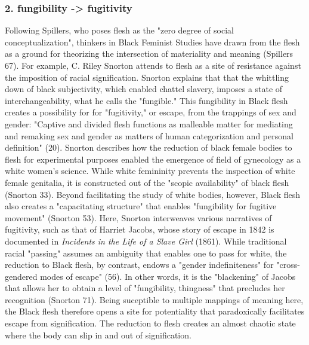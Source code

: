 \documentclass[11pt]{article}
\begin{document}
\subsubsection{2. fungibility -> fugitivity}
\label{sec:orgc5f9a62}
Following Spillers, who poses flesh as the "zero degree of social
conceptualization", thinkers in Black Feminist Studies have drawn from
the flesh as a ground for theorizing the intersection of materiality
and meaning (Spillers 67). For example, C. Riley Snorton attends to
flesh as a site of resistance against the imposition of racial
signification. Snorton explains that that the whittling down of black
subjectivity, which enabled chattel slavery, imposes a state of
interchangeability, what he calls the "fungible." This fungibility in
Black flesh creates a possibility for for "fugitivity," or escape,
from the trappings of sex and gender: "Captive and divided flesh
functions as malleable matter for mediating and remaking sex and
gender as matters of human categorization and personal definition"
(20). Snorton describes how the reduction of black female bodies to
flesh for experimental purposes enabled the emergence of field of
gynecology as a white women's science. While white femininity prevents
the inspection of white female genitalia, it is constructed out of the
"scopic availability" of black flesh (Snorton 33). Beyond facilitating
the study of white bodies, however, Black flesh also creates a
"capacitating structure" that enables "fungibility for fugitive
movement" (Snorton 53). Here, Snorton interweaves various narratives
of fugitivity, such as that of Harriet Jacobs, whose story of escape
in 1842 is documented in \emph{Incidents in the Life of a Slave Girl}
(1861). While traditional racial "passing" assumes an ambiguity that
enables one to pass for white, the reduction to Black flesh, by
contrast, endows a "gender indefiniteness" for "cross-gendered modes
of escape" (56). In other words, it is the "blackening" of Jacobs that
allows her to obtain a level of "fungibility, thingness" that
precludes her recognition (Snorton 71). Being suceptible to multiple
mappings of meaning here, the Black flesh therefore opens a site for
potentiality that paradoxically facilitates escape from
signification. The reduction to flesh creates an almost chaotic state
where the body can slip in and out of signification.
\end{document}

